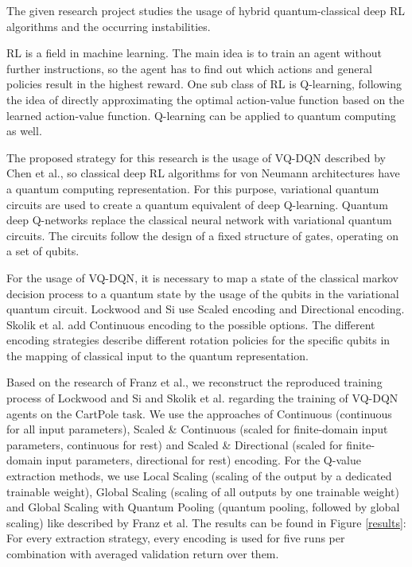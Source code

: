 The given research project studies the usage of hybrid quantum-classical deep \ac{RL} algorithms and the occurring instabilities.

\ac{RL} is a field in machine learning.
The main idea is to train an agent without further instructions, so the agent has to find out which actions and general policies result in the highest reward.
One sub class of \ac{RL} is Q-learning, following the idea of directly approximating the optimal action-value function based on the learned action-value function.\autocite{rl} 
Q-learning can be applied to quantum computing as well.


The proposed strategy for this research is the usage of \ac{VQ-DQN} described by Chen et al., so classical deep \ac{RL} algorithms for von Neumann architectures have a quantum computing representation.\autocite{vqdqn}
For this purpose, variational quantum circuits are used to create a quantum equivalent of deep Q-learning.
Quantum deep Q-networks replace the classical neural network with variational quantum circuits.
The circuits follow the design of a fixed structure of gates, operating on a set of qubits.\autocite{circuits}


For the usage of \ac{VQ-DQN}, it is necessary to map a state of the classical markov decision process to a quantum state by the usage of the qubits in the variational quantum circuit. 
Lockwood and Si use Scaled encoding and Directional encoding.\autocite{lockwood}
Skolik et al. add Continuous encoding to the possible options.\autocite{skolik} 
The different encoding strategies describe different rotation policies for the specific qubits in the mapping of classical input to the quantum representation.


Based on the research of Franz et al., we reconstruct the reproduced training process of Lockwood and Si and Skolik et al. regarding the training of \ac{VQ-DQN} agents on the CartPole task. 
We use the approaches of Continuous (continuous for all input parameters), Scaled \& Continuous (scaled for finite-domain input parameters, continuous for rest) and Scaled \& Directional (scaled for finite-domain input parameters, directional for rest) encoding. 
For the Q-value extraction methods, we use Local Scaling (scaling of the output by a dedicated trainable weight), Global Scaling (scaling of all outputs by one trainable weight) and Global Scaling with Quantum Pooling (quantum pooling, followed by global scaling) like described by Franz et al.
The results can be found in Figure \ref{results}: For every extraction strategy, every encoding is used for five runs per combination with averaged validation return over them.

